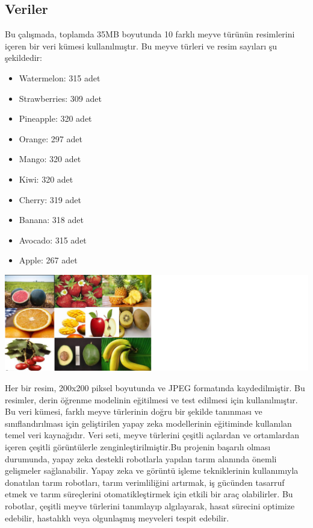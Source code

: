 \documentclass[12pt,a4paper]{article}
\begin{document}
\begin{center}
\begin{enumerate}
\begin{enumerate}
				\pagebreak
				\begin{center}
					\section*{Veriler}
				\end{center}
				
				
				
				Bu çalışmada, toplamda 35MB boyutunda 10 farklı meyve türünün resimlerini içeren bir veri kümesi kullanılmıştır. Bu meyve türleri ve resim sayıları şu şekildedir:
				
				\begin{itemize}
					\item Watermelon: 315 adet
					\item Strawberries: 309 adet
					\item Pineapple: 320 adet
					\item Orange: 297 adet
					\item Mango: 320 adet
					\item Kiwi: 320 adet
					\item Cherry: 319 adet
					\item Banana: 318 adet
					\item Avocado: 315 adet
					\item Apple: 267 adet
				\end{itemize}
				\includegraphics[scale=0.4]{train.png}
				
				Her bir resim, 200x200 piksel boyutunda ve JPEG formatında kaydedilmiştir. Bu resimler, derin öğrenme modelinin eğitilmesi ve test edilmesi için kullanılmıştır.		
				Bu veri kümesi, farklı meyve türlerinin doğru bir şekilde tanınması ve sınıflandırılması için geliştirilen yapay zeka modellerinin eğitiminde kullanılan temel veri kaynağıdır. Veri seti, meyve türlerini çeşitli açılardan ve ortamlardan içeren çeşitli görüntülerle zenginleştirilmiştir.Bu projenin başarılı olması durumunda, yapay zeka destekli robotlarla yapılan tarım alanında önemli gelişmeler sağlanabilir. Yapay zeka ve görüntü işleme tekniklerinin kullanımıyla donatılan tarım robotları, tarım verimliliğini artırmak, iş gücünden tasarruf etmek ve tarım süreçlerini otomatikleştirmek için etkili bir araç olabilirler. Bu robotlar, çeşitli meyve türlerini tanımlayıp algılayarak, hasat sürecini optimize edebilir, hastalıklı veya olgunlaşmış meyveleri tespit edebilir.  
				

\end{enumerate}
\end{enumerate}
\end{center}
\end{document}
